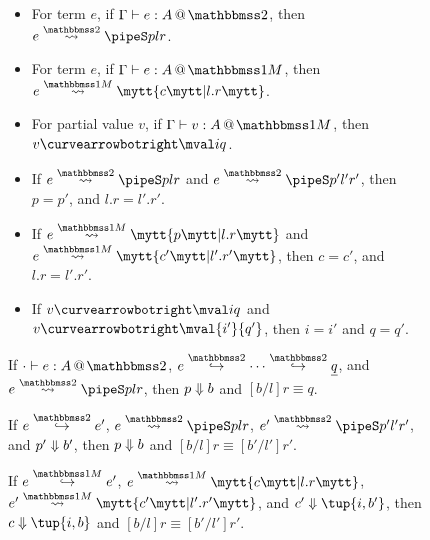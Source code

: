 
\begin{figure*}
\begin{abstrsyn}

\begin{theorem}  \leavevmode
\label{thm:total} 
\begin{itemize} 
\item For term $e$, if $\typestwo e A$, then $\splittwo e A p l r$. 
\item For term $e$, if $\typesone e A$, then $\splitone e A c {l.r}$.
\item For partial value $v$, if $\typesone v A$, then $v \vsplito \mval i q$.
\end{itemize}
\end{theorem}

\begin{theorem}  \leavevmode
\label{thm:unique}
\begin{itemize} 
\item If $\splittwo e A p l r$ and $\splittwo e A {p'} {l'} {r'}$, then $p = p'$, and $l.r = l'.r'$.
\item If $\splitone e A p {l.r}$ and $\splitone e A {c'} {l'.r'}$, then $c = c'$, and $l.r = l'.r'$.
\item If $v \vsplito \mval i q$ and $v \vsplito \mval {i'} {q'}$, then $i = i'$ and $q = q'$.
\end{itemize}
\end{theorem}

\begin{theorem} 
\label{thm:allCorrect}
If $\typestwo [\cdot] e A$, $e \stepsym \bbtwo \cdots \stepsym \bbtwo \exv q$, and $\splittwo e A p l r$,
then ${p} \Downarrow {b}$ and $[b/l]r \equiv q$.
\end{theorem}

\begin{lemma} 
\label{lem:twoCorrect}
If $e \stepsym \bbtwo e'$, $\splittwo e A p  l r$, $\splittwo {e'} A {p'} {l'} {r'}$, and ${p'} \Downarrow {b'}$,
then ${p} \Downarrow {b}$ and $[b/l]r \equiv [b'/l']r'$.
\end{lemma}

\begin{lemma} 
\label{lem:oneCorrect}
If $e \stepsym \bbonem e'$, $\splitone e A c {l.r}$, $\splitone {e'} A {c'} {l'.r'}$, and $\reduce {c'} {\tup{i,b'}}$,
then $\reduce c {\tup {i,b}}$ and $[b/l]r \equiv [b'/l']r'$.
\end{lemma}


\end{abstrsyn}
\end{figure*}
